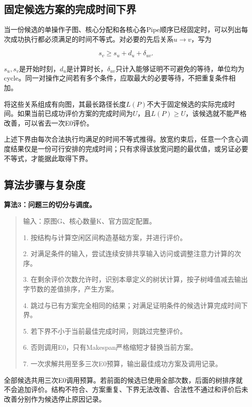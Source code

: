 \documentclass[anonymous,notoc]{gmcm2026}
\begin{document}
\subsection{固定候选方案的完成时间下界}

当一份候选的单操作子图、核心分配和各核心各Pipe顺序已经固定时，可以列出每次成功执行都必须满足的时间不等式。对必要的先后关系\(u\to v\)，写为

\begin{equation}
s_v\ge s_u+d_u+\delta_{uv}.
\end{equation}

\(s_u,s_v\)是开始时刻，\(d_u\)是计算时长，\(\delta_{uv}\)只计入能够证明不可避免的等待，单位均为cycle。同一对操作之间若有多个条件，应取最大的必要等待，不把重复条件相加。

将这些关系组成有向图，其最长路径长度\(L(P)\)不大于固定候选的实际完成时间。如果当前已成功评价方案的完成时间为\(U\)，且\(L(P)\ge U\)，该候选就不能严格改善，可以省去一次E0评价。

上述下界由每次合法执行均满足的时间不等式推得。放宽约束后，任意一个贪心调度结果仅是一份可行安排的完成时间；只有求得该放宽问题的最优值，或另证必要不等式，才能据此取得下界。

\subsection{算法步骤与复杂度}

\textbf{算法3：问题三的切分与调度。}

\begin{quote}
输入：原图G、核心数量K、官方固定配置。

1. 按结构与计算空闲区间构造基础方案，并进行评价。

2. 对满足条件的输入，尝试连续安排共享输入访问或调整注意力计算的次序。

3. 在剩余评价次数允许时，识别本章定义的树状计算，按子树峰值减去输出字节数的差值排序，产生方案。

4. 跳过与已有方案完全相同的结果；对满足证明条件的候选计算完成时间下界。

5. 若下界不小于当前最佳完成时间，则跳过完整评价。

6. 否则调用E0，只有Makespan严格缩短才替换当前方案。

7. 一次求解共用至多三次E0预算，输出最佳成功方案及调用记录。
\end{quote}

全部候选共用三次E0调用预算。若前面的候选已使用全部次数，后面的树排序就不会追加评价。结构不符合、方案重复、下界无法改善、合法性不通过和评价后未改善分别作为候选停止原因记录。
\end{document}
